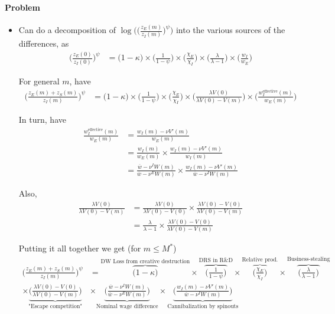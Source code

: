 \documentclass[12pt,english]{article}
\theoremstyle{remark}
\begin{document}
\paragraph{Problem} 

\begin{itemize}
	\item Can do a decomposition of $\log\Big(\big(\frac{z_E(m)}{z_I(m)}\big)^{\psi}\Big)$ into the various sources of the differences, as
	\begin{align*}
		\Big(\frac{z_E(0)}{z_I(0)}\Big)^{\psi} &= \Bigg(1-\kappa \Bigg) \times \Bigg(\frac{1}{1-\psi} \Bigg) \times \Bigg( \frac{\chi_E}{\chi_I} \Bigg) \times \Bigg( \frac{\lambda}{\lambda-1} \Bigg) \times \Bigg( \frac{w_I}{w_E} \Bigg) 
	\end{align*}
	
	For general $m$, have
	\begin{align*}
	\Big(\frac{z_E(m) + z_S(m)}{z_I(m)}\Big)^{\psi} &=  \Bigg(1-\kappa \Bigg) \times \Bigg(\frac{1}{1-\psi} \Bigg) \times \Bigg( \frac{\chi_E}{\chi_I} \Bigg) \times \Bigg( \frac{\lambda V(0)}{\lambda V(0) - V(m)} \Bigg) \times \Bigg( \frac{w_I^{\textrm{effective}}(m)}{w_E(m)} \Bigg) 
	\end{align*}
	
	In turn, have
	\begin{align*}
		\frac{w_I^{\textrm{effective}}(m)}{w_E(m)} &= \frac{w_I(m) - \nu V'(m)}{w_E(m)} \\
								  				   &= \frac{w_I(m)}{w_E(m)} \times \frac{w_I(m) - \nu V'(m)}{w_I(m)} \\
								  				   &= \frac{\overline{w} - \nu^I W(m)}{\overline{w} - \nu^E W(m)}  \times \frac{w_I(m) - \nu V'(m)}{\overline{w} - \nu^I W(m)}
 	\end{align*}
 	
 	Also,
 	\begin{align*}
 		\frac{\lambda V(0)}{\lambda V(0) - V(m)} &= \frac{\lambda V(0)}{\lambda V(0) - V(0)} \times \frac{\lambda V(0) - V(0)}{\lambda V(0) - V(m)} \\
 		                            &= \frac{\lambda}{\lambda - 1} \times \frac{\lambda V(0) - V(0)}{\lambda V(0) - V(m)}
 	\end{align*}
 	
 	Putting it all together we get (for $m \le M^*$)
 	\begin{align*}
	\Bigg(\frac{z_E(m) + z_S(m)}{z_I(m)}\Bigg)^{\psi} &=  \overbrace{\Bigg(1-\kappa \Bigg) }^{\textrm{DW Loss from creative destruction}}\times \overbrace{\Bigg(\frac{1}{1-\psi} \Bigg)}^{\textrm{DRS in R\&D}} \times \overbrace{\Bigg( \frac{\chi_E}{\chi_I} \Bigg) }^{\textrm{Relative prod.}}\times \overbrace{\Bigg( \frac{\lambda}{\lambda - 1}  \Bigg) }^{\textrm{Business-stealing}} \\ \times \underbrace{\Bigg( \frac{\lambda V(0) - V(0)}{\lambda V(0) - V(m)}\Bigg)}_{\textrm{"Escape competition"}}
	          &\times \underbrace{\Bigg( \frac{\overline{w} - \nu^I W(m)}{\overline{w} - \nu^E W(m)}\Bigg)}_{\textrm{Nominal wage difference}} \times \underbrace{\Bigg( \frac{w_I(m) - \nu V'(m)}{\overline{w} - \nu^I W(m)} \Bigg)}_{\textrm{Cannibalization by spinouts}}
 	\end{align*}
 	

\end{itemize}
\end{document}
